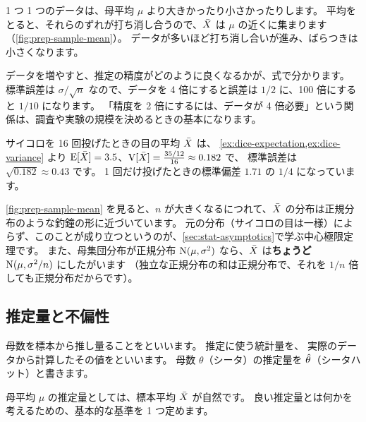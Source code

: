 \begin{intuition}
  1 つ 1 つのデータは、母平均 $\mu$ より大きかったり小さかったりします。
  平均をとると、それらのずれが打ち消し合うので、$\bar{X}$ は $\mu$ の近くに集まります（\cref{fig:prep-sample-mean}）。
  データが多いほど打ち消し合いが進み、ばらつきは小さくなります。
\end{intuition}

\begin{merit}
  データを増やすと、推定の精度がどのように良くなるかが、式で分かります。
  標準誤差は $\sigma/\sqrt{n}$ なので、データを 4 倍にすると誤差は $1/2$ に、100 倍にすると $1/10$ になります。
  「精度を 2 倍にするには、データが 4 倍必要」という関係は、調査や実験の規模を決めるときの基本になります。
\end{merit}

\begin{example}
  サイコロを 16 回投げたときの目の平均 $\bar{X}$ は、
  \cref{ex:dice-expectation,ex:dice-variance} より $\mathrm{E}[\bar{X}] = 3.5$、$\mathrm{V}[\bar{X}] = \frac{35/12}{16} \approx 0.182$ で、
  標準誤差は $\sqrt{0.182} \approx 0.43$ です。
  1 回だけ投げたときの標準偏差 $1.71$ の $1/4$ になっています。
\end{example}

\begin{supplement}[標本平均の分布の形]
  \cref{fig:prep-sample-mean} を見ると、$n$ が大きくなるにつれて、$\bar{X}$ の分布は正規分布のような釣鐘の形に近づいています。
  元の分布（サイコロの目は一様）によらず、このことが成り立つというのが、\cref{sec:stat-asymptotics}で学ぶ中心極限定理です。
  また、母集団分布が正規分布 $\mathrm{N}(\mu, \sigma^2)$ なら、$\bar{X}$ は\textbf{ちょうど} $\mathrm{N}(\mu, \sigma^2/n)$ にしたがいます
  （独立な正規分布の和は正規分布で、それを $1/n$ 倍しても正規分布だからです）。
\end{supplement}

\subsection{推定量と不偏性}

母数を標本から推し量ることをといいます。
推定に使う統計量を、
実際のデータから計算したその値をといいます。
母数 $\theta$（シータ）の推定量を $\hat{\theta}$（シータハット）と書きます。

母平均 $\mu$ の推定量としては、標本平均 $\bar{X}$ が自然です。
良い推定量とは何かを考えるための、基本的な基準を 1 つ定めます。


